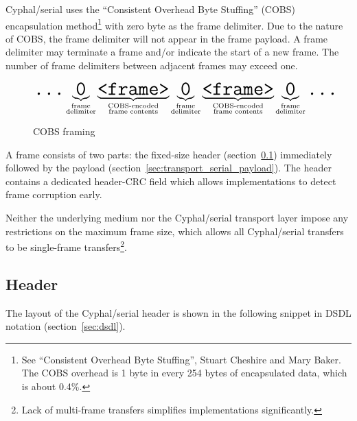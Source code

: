 Cyphal/serial uses the ``Consistent Overhead Byte Stuffing'' (COBS) encapsulation method\footnote{%
    See ``Consistent Overhead Byte Stuffing'', Stuart Cheshire and Mary Baker.
    The COBS overhead is 1 byte in every 254 bytes of encapsulated data, which is about 0.4\%.
} with zero byte as the frame delimiter.
Due to the nature of COBS, the frame delimiter will not appear in the frame payload.
A frame delimiter may terminate a frame and/or indicate the start of a new frame.
The number of frame delimiters between adjacent frames may exceed one.

\begin{figure}[H]
    \centering
    $$
    \texttt{\huge{...}}%
    \underbrace{\texttt{\huge{0}}}_{\substack{\text{frame} \\ \text{delimiter}}}%
    \underbrace{\texttt{\huge{<frame>}}}_{\substack{\text{COBS-encoded} \\ \text{frame contents}}}%
    \underbrace{\texttt{\huge{0}}}_{\substack{\text{frame} \\ \text{delimiter}}}%
    \underbrace{\texttt{\huge{<frame>}}}_{\substack{\text{COBS-encoded} \\ \text{frame contents}}}%
    \underbrace{\texttt{\huge{0}}}_{\substack{\text{frame} \\ \text{delimiter}}}%
    \texttt{\huge{...}}%
    $$
    \caption{COBS framing\label{fig:transport_serial_cobs}}
\end{figure}

A frame consists of two parts:
the fixed-size header (section~\ref{sec:transport_serial_header})
immediately followed by the payload (section~\ref{sec:transport_serial_payload}).
The header contains a dedicated header-CRC field which allows implementations to detect frame corruption early.

Neither the underlying medium nor the Cyphal/serial transport layer impose any restrictions on the maximum frame size,
which allows all Cyphal/serial transfers to be single-frame transfers\footnote{%
    Lack of multi-frame transfers simplifies implementations significantly.
}.

\subsection{Header}\label{sec:transport_serial_header}

The layout of the Cyphal/serial header is shown in the following snippet in DSDL notation
(section~\ref{sec:dsdl}).

